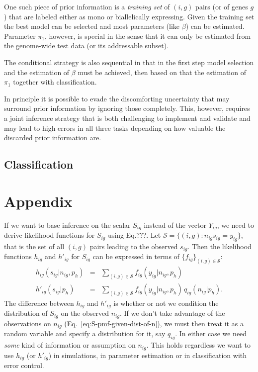 \documentclass[letterpaper]{article}
\begin{document}
One such piece of prior information is a \emph{training set} of \((i,g)\)
pairs (or of genes \(g\)) that are labeled either as mono or biallelically
expressing.  Given the training set the best model can be selected and most
parameters (like \(\beta\)) can be estimated.  Parameter \(\pi_1\), however,
is special in the sense that it can only be estimated from the genome-wide
test data (or its addressable subset).

The conditional strategy is also sequential in that in the first step model selection and
the estimation of \(\beta\) must be achieved, then based on that the
estimation of \(\pi_1\) together with classification.

In principle it is possible to evade the discomforting uncertainty that may
surround prior information by ignoring those completely.  This, however,
requires a joint inference strategy that is both challenging to implement and
validate and may lead to high errors in all three tasks depending on how
valuable the discarded prior information are.

\subsection{Classification}

\section{Appendix}
\label{sec:appendix}

If we want to base inference on the scalar \(S_{ig}\) instead of the vector
\(Y_{ig}\), we need to derive likelihood functions for \(S_{ig}\) using
Eq.???.
Let \(\mathcal{S} = \{(i,g) : n_{ig} s_{ig} = y_{ig}\}\), that is the set of
all \((i,g)\) pairs leading to the observed \(s_{ig}\).  Then the likelihood
functions \(h_{ig}\) and \(h'_{ig}\) for \(S_{ig}\) can be expressed in terms
of \(\{f_{ig}\}_{(i,g)\in\mathcal{S}}\):
\begin{eqnarray}
\label{eq:S-pmf-given-n}
h_{ig}(s_{ig} | n_{ig}, p_h) &=& \sum_{(i,g)\in\mathcal{S}} f_{ig}(y_{ig} | n_{ig}, p_h)
\\
\label{eq:S-pmf-given-dist-of-n}
h'_{ig}(s_{ig} | p_h) &=& \sum_{(i,g)\in\mathcal{S}} f_{ig}(y_{ig} | n_{ig},
p_h) \, q_{ig}(n_{ig}|p_h).
\end{eqnarray}
The difference between \(h_{ig}\) and \(h'_{ig}\) is whether or not we
condition the distribution of \(S_{ig}\) on the observed \(n_{ig}\).  If we
don't take advantage of the observations on \(n_{ig}\) (Eq.~\ref{eq:S-pmf-given-dist-of-n}), we
must then treat it as a random variable and specify a distribution for it, say
\(q_{ig}\). In either case we need \emph{some} kind of information or
assumption on
\(n_{ig}\).  This holds regardless we want to use \(h_{ig}\) (or \(h'_{ig}\))
in simulations, in parameter estimation or in classification with error
control.
\end{document}
